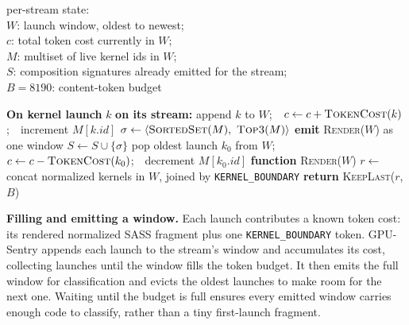 \begin{algorithm}[t]
    \caption{Per-stream window scheduler, run on each kernel launch.}
    \label{alg:scheduler}
    \begin{algorithmic}[1]
        \REQUIRE \parbox[t]{0.86\linewidth}{per-stream state:\\
            \hspace*{1em}$W$: launch window, oldest to newest;\\
            \hspace*{1em}$c$: total token cost currently in $W$;\\
            \hspace*{1em}$M$: multiset of live kernel ids in $W$;\\
            \hspace*{1em}$S$: composition signatures already emitted for the stream;\\
            \hspace*{1em}$B = 8190$: content-token budget}
        \STATE \textbf{On kernel launch} $k$ \textbf{on its stream:}
        \STATE append $k$ to $W$;\ \ $c \gets c + \textsc{TokenCost}(k)$;\ \ increment $M[k.\textit{id}]$
            \RETURN {}
        \ENDIF
        \STATE $\sigma \gets \langle \textsc{SortedSet}(M),\ \textsc{Top3}(M) \rangle$ 
            \STATE \textbf{emit} \textsc{Render}($W$) as one window 
            \STATE $S \gets S \cup \{\sigma\}$
        \ENDIF
            \STATE pop oldest launch $k_0$ from $W$;\ \ $c \gets c - \textsc{TokenCost}(k_0)$;\ \ decrement $M[k_0.\textit{id}]$
        \ENDWHILE
        \STATE
        \STATE \textbf{function} \textsc{Render}($W$) 
        \STATE \quad $r \gets$ concat normalized kernels in $W$, joined by \texttt{KERNEL\_BOUNDARY}
        \STATE \quad \textbf{return} \textsc{KeepLast}($r$, $B$) 
    \end{algorithmic}
\end{algorithm}

\textbf{Filling and emitting a window.}
Each launch contributes a known token cost: its rendered normalized SASS fragment plus one \texttt{KERNEL\_BOUNDARY} token. GPU-Sentry appends each launch to the stream's window and accumulates its cost, collecting launches until the window fills the token budget. It then emits the full window for classification and evicts the oldest launches to make room for the next one. Waiting until the budget is full ensures every emitted window carries enough code to classify, rather than a tiny first-launch fragment.

